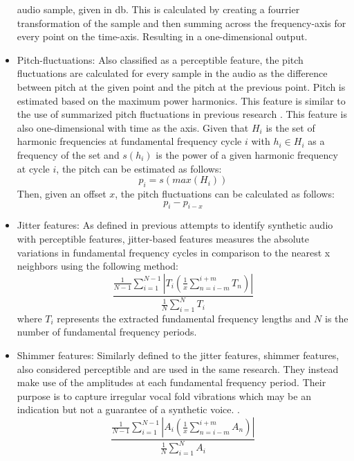 \documentclass{article}
\begin{document}
\begin{itemize}
					audio sample, given in db. This is calculated by creating a fourrier
					transformation of the sample and then summing across the frequency-axis for
					every point on the time-axis. Resulting in a one-dimensional output.
				\item
					Pitch-fluctuations: Also classified as a perceptible feature, the pitch
					fluctuations are calculated for every sample in the audio as the difference
					between pitch at the given point and the pitch at the previous point. Pitch is
					estimated based on the maximum power harmonics. This feature is similar to the
					use of summarized pitch fluctuations in previous research
					\cite{khanjani_learning_2023}. This feature is also one-dimensional with time
					as the axis. Given that \(H_{i}\) is the set of harmonic frequencies at
					fundamental frequency cycle \(i\) with \(h_{i} \in H_{i}\) as a frequency of
					the set and \(s(h_{i})\) is the power of a given harmonic frequency at cycle
					\(i\), the pitch can be estimated as follows:
					\[p_{i} = s(max(H_{i}))\]
					Then, given an offset \(x\), the pitch fluctuations can be calculated as
					follows:
					\[p_{i}-p_{i-x}\]
				\item
					Jitter features: As defined in previous attempts to identify synthetic audio
					\cite{chaiwongyen_deepfake-speech_2023} with perceptible features,
					jitter-based features measures the absolute variations in fundamental
					frequency cycles in comparison to the nearest x neighbors using the following
					method:
					\[ \frac{ \frac{1}{N-1}\sum_{i=1}^{N-1}|T_{i}
						(\frac{1}{x}\sum_{n=i-m}^{i+m}T_{n})|}
					{\frac{1}{N}\sum_{i=1}^{N}T_{i}} \]
					where \(T_{i}\) represents the extracted fundamental frequency lengths and
					\(N\) is the number of fundamental frequency periods.
				\item
					Shimmer features: Similarly defined to the jitter features, shimmer features,
					also considered perceptible and are used in the same research. They instead
					make use of the amplitudes at each fundamental frequency period. Their purpose
					is to capture irregular vocal fold vibrations which may be an indication but
					not a guarantee of a synthetic voice.
					\cite{chaiwongyen_deepfake-speech_2023}.
					\[ \frac{ \frac{1}{N-1}\sum_{i=1}^{N-1}|A_{i}
						(\frac{1}{x}\sum_{n=i-m}^{i+m}A_{n})|}
					{\frac{1}{N}\sum_{i=1}^{N}A_{i}} \]
			\end{itemize}
\end{document}
